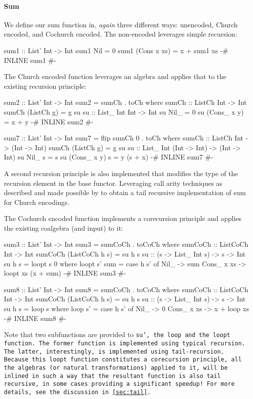 \paragraph{Sum}
We define our sum function in, \textit{again} three different ways:
unencoded, Church encoded, and Cochurch encoded.
The non-encoded leverages simple recursion:
\begin{code}
sum1 :: List' Int -> Int
sum1 Nil = 0
sum1 (Cons x xs) = x + sum1 xs
{-# INLINE sum1 #-}
\end{code}
The Church encoded function leverages an algebra and applies that to the existing recursion principle:
\begin{code}
sum2 :: List' Int -> Int
sum2 = sumCh . toCh
  where sumCh :: ListCh Int -> Int
        sumCh (ListCh g) = g su
        su :: List_ Int Int -> Int
        su Nil_ = 0
        su (Cons_ x y) = x + y
{-# INLINE sum2 #-}

sum7 :: List' Int -> Int
sum7 = flip sumCh 0 . toCh
  where sumCh :: ListCh Int -> (Int -> Int)
        sumCh (ListCh g) = g su
        su :: List_ Int (Int -> Int) -> (Int -> Int)
        su Nil_ s = s
        su (Cons_ x y) s = y (s + x)
{-# INLINE sum7 #-}
\end{code}
A second recursion principle is also implemented that modifies the type of the recursion element in the base functor.
Leveraging call arity techniques as described and made possible by \cite{Breitner2018} to obtain a tail recursive implementation of sum for Church encodings.

The Cochurch encoded function implements a corecursion principle and applies the existing coalgebra (and input) to it:
\begin{code}
sum3 :: List' Int -> Int
sum3 = sumCoCh . toCoCh
  where sumCoCh :: ListCoCh Int -> Int
        sumCoCh (ListCoCh h s) = su h s
        su :: (s -> List_ Int s) -> s -> Int
        su h s = loopt s 0
          where loopt s' sum = case h s' of
                  Nil_ -> sum
                  Cons_ x xs -> loopt xs (x + sum)
{-# INLINE sum3 #-}

sum8 :: List' Int -> Int
sum8 = sumCoCh . toCoCh
  where sumCoCh :: ListCoCh Int -> Int
        sumCoCh (ListCoCh h s) = su h s
        su :: (s -> List_ Int s) -> s -> Int
        su h s = loop s
          where loop s' = case h s' of
                  Nil_ -> 0
                  Cons_ x xs -> x + loop xs
{-# INLINE sum8 #-}
\end{code}
Note that two subfunctions are provided to \tt{su'}, the \tt{loop} and the \tt{loopt} function.
The former function is implemented using typical recursion.
The latter, interestingly, is implemented using tail-recursion.
Because this \tt{loopt} function constitutes a corecursion principle, all the algebras (or natural transformations) applied to it, will be inlined in such a way that the resultant function is also tail recursive, in some cases providing a significant speedup!
For more details, see the discussion in \autoref{sec:tail}.


